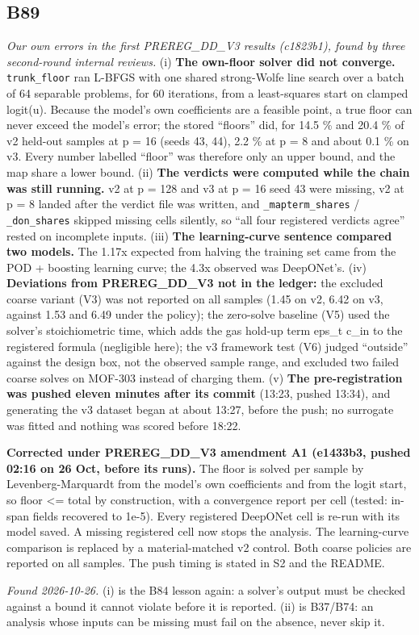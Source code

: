 \documentclass[10pt]{article}
\begin{document}
\subsection*{B89}\label{led:B89}
\begin{description}[leftmargin=0pt,itemsep=1pt]
\item[Defect.] \emph{Our own errors in the first PREREG\_DD\_V3 results (c1823b1), found by three second-round internal reviews.} (i) \textbf{The own-floor solver did not converge.} \texttt{trunk\_floor} ran L-BFGS with one shared strong-Wolfe line search over a batch of 64 separable problems, for 60 iterations, from a least-squares start on clamped logit(u). Because the model's own coefficients are a feasible point, a true floor can never exceed the model's error; the stored ``floors'' did, for 14.5 \% and 20.4 \% of v2 held-out samples at p = 16 (seeds 43, 44), 2.2 \% at p = 8 and about 0.1 \% on v3. Every number labelled ``floor'' was therefore only an upper bound, and the map share a lower bound. (ii) \textbf{The verdicts were computed while the chain was still running.} v2 at p = 128 and v3 at p = 16 seed 43 were missing, v2 at p = 8 landed after the verdict file was written, and \texttt{\_mapterm\_shares} / \texttt{\_don\_shares} skipped missing cells silently, so ``all four registered verdicts agree'' rested on incomplete inputs. (iii) \textbf{The learning-curve sentence compared two models.} The 1.17x expected from halving the training set came from the POD + boosting learning curve; the 4.3x observed was DeepONet's. (iv) \textbf{Deviations from PREREG\_DD\_V3 not in the ledger:} the excluded coarse variant (V3) was not reported on all samples (1.45 on v2, 6.42 on v3, against 1.53 and 6.49 under the policy); the zero-solve baseline (V5) used the solver's stoichiometric time, which adds the gas hold-up term eps\_t c\_in to the registered formula (negligible here); the v3 framework test (V6) judged ``outside'' against the design box, not the observed sample range, and excluded two failed coarse solves on MOF-303 instead of charging them. (v) \textbf{The pre-registration was pushed eleven minutes after its commit} (13:23, pushed 13:34), and generating the v3 dataset began at about 13:27, before the push; no surrogate was fitted and nothing was scored before 18:22.
\item[Resolution.] \textbf{Corrected under PREREG\_DD\_V3 amendment A1 (e1433b3, pushed 02:16 on 26 Oct, before its runs).} The floor is solved per sample by Levenberg-Marquardt from the model's own coefficients and from the logit start, so floor <= total by construction, with a convergence report per cell (tested: in-span fields recovered to 1e-5). Every registered DeepONet cell is re-run with its model saved. A missing registered cell now stops the analysis. The learning-curve comparison is replaced by a material-matched v2 control. Both coarse policies are reported on all samples. The push timing is stated in S2 and the README.
\item[Note.] \emph{Found 2026-10-26.} (i) is the B84 lesson again: a solver's output must be checked against a bound it cannot violate before it is reported. (ii) is B37/B74: an analysis whose inputs can be missing must fail on the absence, never skip it.
\end{description}
\end{document}
